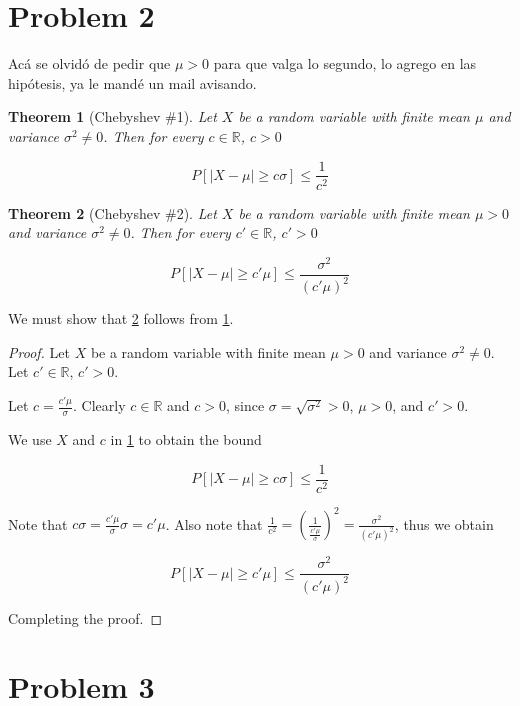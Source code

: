 \documentclass[11pt]{amsart}
\newtheorem{theorem}{Theorem}[section]
\begin{document}
\section*{Problem 2}
\addtocounter{section}{1}
\setcounter{theorem}{0}

{\color{red}
Acá se olvidó de pedir que $\mu > 0$ para que valga lo segundo, lo agrego en las hipótesis, ya le mandé un mail avisando.
}

\begin{theorem}[Chebyshev \#1]\label{cheb1}
Let $X$ be a random variable with finite mean $\mu$ and variance $\sigma^2 \ne 0$. Then for every $c \in \mathbb{R}$, $c > 0$

$$
P\left[|X - \mu| \ge c \sigma\right] \le \frac{1}{c^2}
$$
\end{theorem}

\begin{theorem}[Chebyshev \#2]\label{cheb2}
Let $X$ be a random variable with finite mean $\mu > 0$ and variance $\sigma^2 \ne 0$. Then for every $c' \in \mathbb{R}$, $c' > 0$

$$
P\left[|X - \mu| \ge c' \mu\right] \le \frac{\sigma^2}{(c'\mu)^2}
$$
\end{theorem}

We must show that \ref{cheb2} follows from \ref{cheb1}.

\begin{proof}
Let $X$ be a random variable with finite mean $\mu > 0$ and variance $\sigma^2 \ne 0$. Let $c' \in \mathbb{R}$, $c' > 0$.

Let $c = \frac{c' \mu}{\sigma}$. Clearly $c \in \mathbb{R}$ and $c > 0$, since $\sigma = \sqrt{\sigma^2} > 0$, $\mu > 0$, and $c' > 0$.

We use $X$ and $c$ in \ref{cheb1} to obtain the bound

$$
P\left[|X - \mu| \ge c \sigma\right] \le \frac{1}{c^2}
$$

Note that $c \sigma = \frac{c' \mu}{\sigma} \sigma = c' \mu$. Also note that $\frac{1}{c^2} = \left(\frac{1}{\frac{c' \mu}{\sigma}}\right)^2 = \frac{\sigma^2}{(c' \mu)^2}$, thus we obtain

$$
P\left[|X - \mu| \ge c' \mu\right] \le \frac{\sigma^2}{(c' \mu)^2}
$$

Completing the proof.
\end{proof}



\section*{Problem 3}
\addtocounter{section}{1}
\setcounter{theorem}{0}
\end{document}
